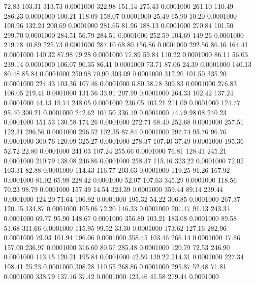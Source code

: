   72.83  103.31  313.73   0.0001000
 322.98  151.14  275.43   0.0001000
 261.10  110.49  286.23   0.0001000
 100.21  118.09  158.07   0.0001000
  25.49   65.90   10.20   0.0001000
 100.96  132.24  200.69   0.0001000
 281.65   81.96  188.13   0.0001000
 270.84  101.50  299.70   0.0001000
 284.51   56.79  284.51   0.0001000
 252.59  104.69  149.26   0.0001000
 219.78   40.89  225.73   0.0001000
 287.10   68.80  156.86   0.0001000
 292.56   86.16  164.41   0.0001000
 140.32   87.98   79.28   0.0001000
  77.89   59.84  110.22   0.0001000
  86.11   56.03  239.14   0.0001000
 106.07   90.35   86.41   0.0001000
  73.71   87.06   24.39   0.0001000
 140.13   80.48   85.84   0.0001000
 250.98   70.90  303.09   0.0001000
 312.20  101.50  335.20   0.0001000
 224.43  103.36  107.46   0.0001000
   6.80   38.78  309.83   0.0001000
 276.83  106.05  219.41   0.0001000
 131.56   33.91  297.99   0.0001000
 264.33  102.42  137.24   0.0001000
  44.13   19.74  248.05   0.0001000
 236.05  103.21  211.09   0.0001000
 124.77   95.40  300.21   0.0001000
 242.62  107.50  336.19   0.0001000
  74.79   98.08  240.23   0.0001000
 151.53  130.58  174.26   0.0001000
 272.71   68.40  252.68   0.0001000
 257.51  122.31  296.56   0.0001000
 296.52  102.35   87.84   0.0001000
 297.74   95.76   96.76   0.0001000
 300.76  120.09  325.27   0.0001000
 278.37  107.40   37.49   0.0001000
 195.36   52.72   22.80   0.0001000
 241.03  107.24  255.66   0.0001000
  76.81  128.41  245.21   0.0001000
 210.79  138.08  246.86   0.0001000
 258.37  115.16  323.22   0.0001000
  72.02  103.31   82.88   0.0001000
 114.43  116.77  203.63   0.0001000
 119.25   91.26  167.92   0.0001000
  81.02   65.98  228.42   0.0001000
  52.07  107.63  345.29   0.0001000
 118.56   70.23   98.79   0.0001000
 157.49   14.54  323.39   0.0001000
 359.44   89.14  239.44   0.0001000
 124.20   71.64  106.92   0.0001000
 195.32   54.22  306.85   0.0001000
 267.37  120.15  134.87   0.0001000
 105.06   72.20  146.33   0.0001000
 201.47   91.13  243.31   0.0001000
  69.77   95.90  148.67   0.0001000
 356.80  103.21  183.08   0.0001000
  89.58   51.68  311.66   0.0001000
 115.95   99.52   33.30   0.0001000
 173.62  127.16  282.96   0.0001000
  79.03  101.94  196.06   0.0001000
 358.45  103.46  266.14   0.0001000
  17.66  157.00  236.97   0.0001000
 316.60   80.57  285.48   0.0001000
 120.79   72.53  246.90   0.0001000
 113.15  120.21  195.84   0.0001000
  42.59  139.22  214.31   0.0001000
 227.34  108.41   25.23   0.0001000
 308.28  110.55  268.86   0.0001000
 295.87   52.48   71.81   0.0001000
 338.79  137.16   37.42   0.0001000
 123.46   41.58  279.44   0.0001000
